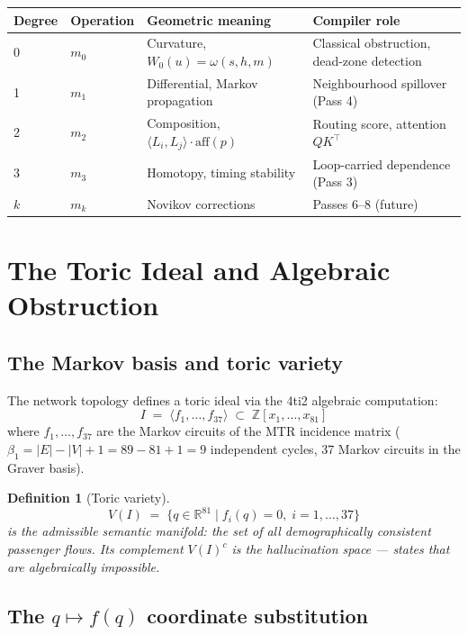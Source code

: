 \documentclass[11pt,a4paper]{article}
\newtheorem{definition}[theorem]{Definition}
\begin{document}
\begin{center}
\renewcommand{\arraystretch}{1.3}
\begin{tabular}{llll}
\toprule
Degree & Operation & Geometric meaning & Compiler role \\
\midrule
0 & $m_0$ & Curvature, $W_0(u) = \omega(s,h,m)$ &
  Classical obstruction, dead-zone detection \\
1 & $m_1$ & Differential, Markov propagation &
  Neighbourhood spillover (Pass 4) \\
2 & $m_2$ & Composition, $\langle L_i,L_j\rangle\cdot\mathrm{aff}(p)$ &
  Routing score, attention $QK^\top$ \\
3 & $m_3$ & Homotopy, timing stability &
  Loop-carried dependence (Pass 3) \\
$k$ & $m_k$ & Novikov corrections &
  Passes 6--8 (future) \\
\bottomrule
\end{tabular}
\end{center}

\section{The Toric Ideal and Algebraic Obstruction}

\subsection{The Markov basis and toric variety}

The network topology defines a toric ideal via the 4ti2
algebraic computation:
\[
  I \;=\; \langle f_1, \ldots, f_{37} \rangle \;\subset\;
  \mathbb{Z}[x_1,\ldots,x_{81}]
\]
where $f_1,\ldots,f_{37}$ are the Markov circuits of the
MTR incidence matrix ($\beta_1 = |E| - |V| + 1 = 89-81+1 = 9$
independent cycles, 37 Markov circuits in the Graver basis).

\begin{definition}[Toric variety]
\[
  V(I) \;=\; \{ q \in \mathbb{R}^{81} \mid f_i(q) = 0,\;
  i = 1,\ldots,37 \}
\]
is the \emph{admissible semantic manifold}: the set of all
demographically consistent passenger flows.
Its complement $V(I)^c$ is the \emph{hallucination space} ---
states that are algebraically impossible.
\end{definition}

\subsection{The $q \mapsto f(q)$ coordinate substitution}
\end{document}
